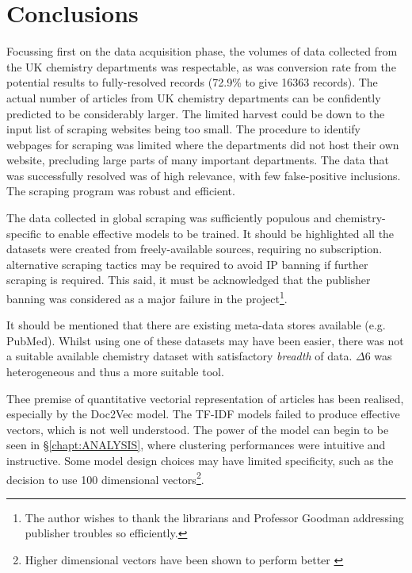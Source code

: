 \chapter{Conclusions}
Focussing first on the data acquisition phase, the volumes of data collected from the UK chemistry departments was respectable, as was conversion rate from the potential results to fully-resolved records (72.9\%  to give 16363 records). The actual number of articles from UK chemistry departments can be confidently predicted to be considerably larger. The limited harvest could be down to the input list of scraping websites being too small. The procedure to identify webpages for scraping was limited where the departments did not host their own website, precluding large parts of many important departments. The data that was successfully resolved was of high relevance, with few false-positive inclusions. The scraping program was robust and efficient.

The data collected in global scraping was sufficiently populous and chemistry-specific to enable effective models to be trained. It should be highlighted all the datasets were created from freely-available sources, requiring no subscription. alternative scraping tactics may be required to avoid IP banning if further scraping is required. This said, it must be acknowledged that the publisher banning was considered as a major failure in the project\footnote{The author wishes to thank the librarians and Professor Goodman addressing publisher troubles so efficiently.}.

It should be mentioned that there are existing meta-data stores available (e.g. PubMed). Whilst using one of these datasets may have been easier, there was not a suitable available chemistry dataset with satisfactory \emph{breadth} of data. $\Delta6$ was heterogeneous and thus a more suitable tool.

Thee premise of quantitative vectorial representation of articles has been realised, especially by the Doc2Vec model. The TF-IDF models failed to produce effective vectors, which is not well understood. The power of the model can begin to be seen in \S\ref{chapt:ANALYSIS}, where clustering performances were intuitive and instructive.
Some model design choices may have limited specificity, such as the decision to use 100 dimensional vectors\footnote{Higher dimensional vectors have been shown to perform better \cite{word2vec1}}.

